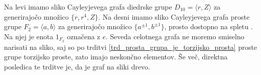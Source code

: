 \begin{primer}
Na levi imamo sliko Cayleyjevega grafa diedrske grupe $D_{10} = \langle r, Z \rangle$ za generirajočo množico $\{ r, r^4 ,Z \}$. Na desni imamo sliko Cayleyjevega grafa proste grupe $F_2 = \langle a, b \rangle$ za generirajočo množico $\{ a^{\pm 1}, b^{\pm 1} \}$, prosto dostopno na spletu \cite{wikipedia_cayley_graph}. 
Na njej je enota $1_{F_2}$ označena z $e$. Seveda celotnega grafa ne moremo smiselno narisati na sliko, saj so po trditvi \ref{trd_prosta_grupa_je_torzijsko_prosta} proste grupe torzijsko proste, zato imajo neskončno elementov. 
Še več, direktna posledica te trditve je, da je graf na sliki drevo.

\begin{figure}[h]
    \centering
    \begin{minipage}[t]{0.45\textwidth}
        \centering
\end{minipage}
\end{figure}
\end{primer}
